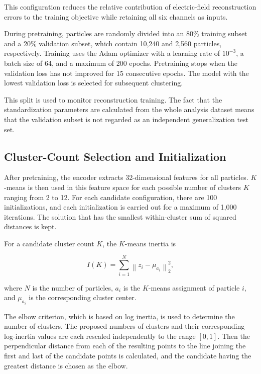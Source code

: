 This configuration reduces the relative contribution of electric-field reconstruction errors to the training objective while retaining all six channels as inputs.

During pretraining, particles are randomly divided into an 80\% training subset and a 20\% validation subset, which contain 10,240 and 2,560 particles, respectively. Training uses the Adam optimizer with a learning rate of \(10^{-3}\), a batch size of 64, and a maximum of 200 epochs. Pretraining stops when the validation loss has not improved for 15 consecutive epochs. The model with the lowest validation loss is selected for subsequent clustering.

This split is used to monitor reconstruction training. The fact that the standardization parameters are calculated from the whole analysis dataset means that the validation subset is not regarded as an independent generalization test set.

\subsection{Cluster-Count Selection and Initialization}

After pretraining, the encoder extracts 32-dimensional features for all particles. \(K\)-means is then used in this feature space for each possible number of clusters \(K\) ranging from 2 to 12. For each candidate configuration, there are 100 initializations, and each initialization is carried out for a maximum of 1,000 iterations. The solution that has the smallest within-cluster sum of squared distances is kept.

For a candidate cluster count \(K\), the \(K\)-means inertia is

\begin{equation} I(K) = \sum_{i=1}^{N} \left\|z_i-\mu_{a_i}\right\|_2^2, \end{equation}

where \(N\) is the number of particles, \(a_i\) is the \(K\)-means assignment of particle \(i\), and \(\mu_{a_i}\) is the corresponding cluster center.

The elbow criterion, which is based on log inertia, is used to determine the number of clusters. The proposed numbers of clusters and their corresponding log-inertia values are each rescaled independently to the range \([0,1]\). Then the perpendicular distance from each of the resulting points to the line joining the first and last of the candidate points is calculated, and the candidate having the greatest distance is chosen as the elbow.

